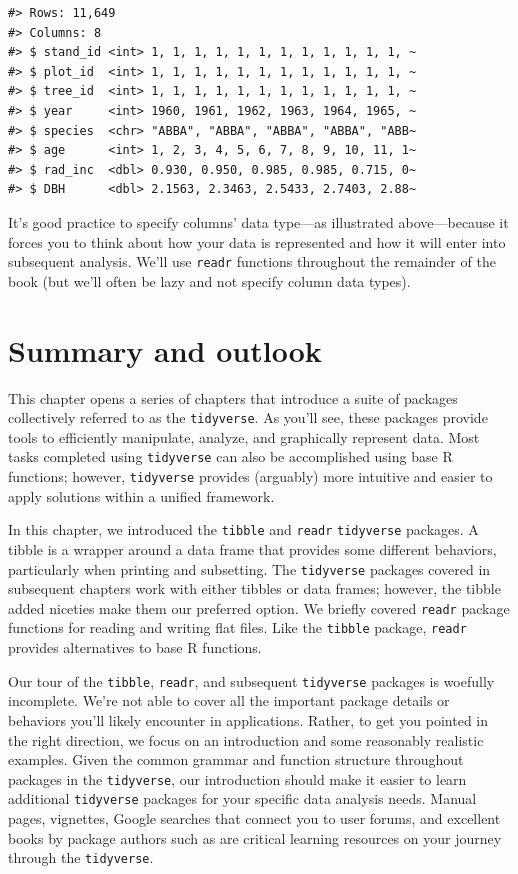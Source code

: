 \documentclass[
  11pt,
]{krantz}
\theoremstyle{definition}
\theoremstyle{definition}
\theoremstyle{definition}
\theoremstyle{definition}
\theoremstyle{remark}
\begin{document}
\begin{verbatim}
#> Rows: 11,649
#> Columns: 8
#> $ stand_id <int> 1, 1, 1, 1, 1, 1, 1, 1, 1, 1, 1, 1, ~
#> $ plot_id  <int> 1, 1, 1, 1, 1, 1, 1, 1, 1, 1, 1, 1, ~
#> $ tree_id  <int> 1, 1, 1, 1, 1, 1, 1, 1, 1, 1, 1, 1, ~
#> $ year     <int> 1960, 1961, 1962, 1963, 1964, 1965, ~
#> $ species  <chr> "ABBA", "ABBA", "ABBA", "ABBA", "ABB~
#> $ age      <int> 1, 2, 3, 4, 5, 6, 7, 8, 9, 10, 11, 1~
#> $ rad_inc  <dbl> 0.930, 0.950, 0.985, 0.985, 0.715, 0~
#> $ DBH      <dbl> 2.1563, 2.3463, 2.5433, 2.7403, 2.88~
\end{verbatim}

It's good practice to specify columns' data type---as illustrated above---because it forces you to think about how your data is represented and how it will enter into subsequent analysis. We'll use \texttt{readr} functions throughout the remainder of the book (but we'll often be lazy and not specify column data types).

\hypertarget{summaryTidyverse}{%
\section{Summary and outlook}\label{summaryTidyverse}}

This chapter opens a series of chapters that introduce a suite of packages collectively referred to as the \texttt{tidyverse}. As you'll see, these packages provide tools to efficiently manipulate, analyze, and graphically represent data. Most tasks completed using \texttt{tidyverse} can also be accomplished using base R functions; however, \texttt{tidyverse} provides (arguably) more intuitive and easier to apply solutions within a unified framework.

In this chapter, we introduced the \texttt{tibble} and \texttt{readr} \texttt{tidyverse} packages. A tibble is a wrapper around a data frame that provides some different behaviors, particularly when printing and subsetting. The \texttt{tidyverse} packages covered in subsequent chapters work with either tibbles or data frames; however, the tibble added niceties make them our preferred option. We briefly covered \texttt{readr} package functions for reading and writing flat files. Like the \texttt{tibble} package, \texttt{readr} provides alternatives to base R functions.

Our tour of the \texttt{tibble}, \texttt{readr}, and subsequent \texttt{tidyverse} packages is woefully incomplete. We're not able to cover all the important package details or behaviors you'll likely encounter in applications. Rather, to get you pointed in the right direction, we focus on an introduction and some reasonably realistic examples. Given the common grammar and function structure throughout packages in the \texttt{tidyverse}, our introduction should make it easier to learn additional \texttt{tidyverse} packages for your specific data analysis needs. Manual pages, vignettes, Google searches that connect you to user forums, and excellent books by package authors such as \citet{wickham2023} are critical learning resources on your journey through the \texttt{tidyverse}.
\end{document}
